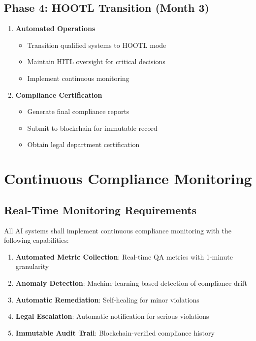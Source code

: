 \documentclass[12pt,a4paper]{article}
\begin{document}
\subsection{Phase 4: HOOTL Transition (Month 3)}

\begin{enumerate}
    \item \textbf{Automated Operations}
    \begin{itemize}
        \item Transition qualified systems to HOOTL mode
        \item Maintain HITL oversight for critical decisions
        \item Implement continuous monitoring
    \end{itemize}
    
    \item \textbf{Compliance Certification}
    \begin{itemize}
        \item Generate final compliance reports
        \item Submit to blockchain for immutable record
        \item Obtain legal department certification
    \end{itemize}
\end{enumerate}

\section{Continuous Compliance Monitoring}

\subsection{Real-Time Monitoring Requirements}

All AI systems shall implement continuous compliance monitoring with the following capabilities:

\begin{enumerate}
    \item \textbf{Automated Metric Collection}: Real-time QA metrics with 1-minute granularity
    \item \textbf{Anomaly Detection}: Machine learning-based detection of compliance drift
    \item \textbf{Automatic Remediation}: Self-healing for minor violations
    \item \textbf{Legal Escalation}: Automatic notification for serious violations
    \item \textbf{Immutable Audit Trail}: Blockchain-verified compliance history
\end{enumerate}
\end{document}
